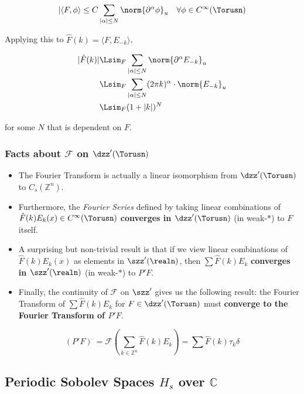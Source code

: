 \[
\vert \langle F,\phi\rangle \leq C\sum_{\vert\alpha\vert\leq N}\norm{\partial^\alpha \phi}_u\quad\forall \phi\in C^\infty(\Torusn)
\]

Applying this to \(\hat{F}(k) = \langle F,E_{-k}\rangle\),

\[
\begin{align}
\vert\hat{F}(k)\vert&\Lsim_F \sum_{\vert\alpha\vert\leq N}\norm{\partial^\alpha E_{-k}}_u\\
&\Lsim_F \sum_{\vert\alpha\vert\leq N}(2\pi k)^{\alpha}\cdot\norm{E_{-k}}_u\\
&\Lsim_F (1+\vert k\vert)^N
\end{align}
\]

for some \(N\) that is dependent on \(F\).

\hypertarget{facts-about-mathcalf-on-dzztorusn}{%
\subsubsection{\texorpdfstring{Facts about \(\mathcal{F}\) on
\(\dzz'(\Torusn)\)}{Facts about \textbackslash mathcal\{F\} on \textbackslash dzz\textquotesingle(\textbackslash Torusn)}}\label{facts-about-mathcalf-on-dzztorusn}}

\begin{itemize}
\item
  The Fourier Transform is actually a linear isomorphism from
  \(\dzz'(\Torusn)\) to \(C_s(\mathbb{Z}^n)\).
\item
  Furthermore, the \emph{Fourier Series} defined by taking linear
  combinations of \(\hat{F}(k)E_k(x)\in C^\infty(\Torusn)\)
  \textbf{converges in \(\dzz'(\Torusn)\)} (in weak-\(\ast\)) to \(F\)
  itself.
\item
  A surprising but non-trivial result is that if we view linear
  combinations of \(\hat{F}(k)E_k(x)\) as elements in \(\szz'(\realn)\),
  then \(\sum \hat{F}(k)E_k\) \textbf{converges in \(\szz'(\realn)\)}
  (in weak-\(\ast\)) to \(P'F\).
\item
  Finally, the continuity of \(\mathcal{F}\) on \(\szz'\) gives us the
  following result: the Fourier Transform of \(\sum \hat{F}(k)E_k\) for
  \(F\in \dzz'(\Torusn)\) must \textbf{converge to the Fourier Transform
  of \(P'F\)}.
\end{itemize}

\[
(P'F)^{\hat{\:}} = \mathcal{F}(\sum_{k\in\mathbb{Z}^n} \hat{F}(k)E_k) = \sum \hat{F}(k)\tau_k\delta
\]

\hypertarget{periodic-sobolev-spaces-h_s-over-mathbbc}{%
\subsection{\texorpdfstring{Periodic Sobolev Spaces \(H_s\) over
\(\mathbb{C}\)}{Periodic Sobolev Spaces H\_s over \textbackslash mathbb\{C\}}}\label{periodic-sobolev-spaces-h_s-over-mathbbc}}

